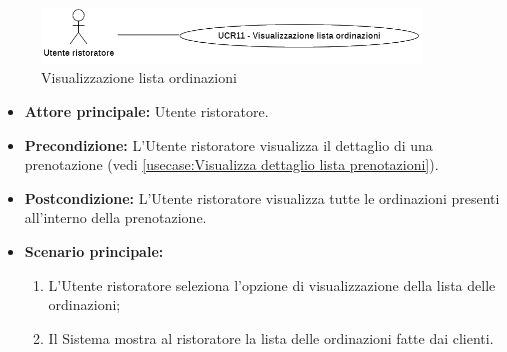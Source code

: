 \label{usecase:Visualizzazione lista ordinazioni}

\begin{figure}[h]
	\centering
	\includegraphics[width=0.9\textwidth]{./uml/UCR11.png} 
	\caption{Visualizzazione lista ordinazioni}
	\label{fig:UCR11}
  \end{figure}

\begin{itemize}
	\item \textbf{Attore principale:} Utente ristoratore.

	\item \textbf{Precondizione:} L'Utente ristoratore visualizza il dettaglio di una prenotazione (vedi \autoref{usecase:Visualizza dettaglio lista prenotazioni}).

	\item \textbf{Postcondizione:} L'Utente ristoratore visualizza tutte le
	      ordinazioni presenti all'interno della prenotazione.

	\item \textbf{Scenario principale:}
	      \begin{enumerate}
		      \item L'Utente ristoratore seleziona l'opzione di visualizzazione della lista delle ordinazioni;

		      \item Il Sistema mostra al ristoratore la lista delle ordinazioni fatte dai clienti.
	      \end{enumerate}
\end{itemize}

